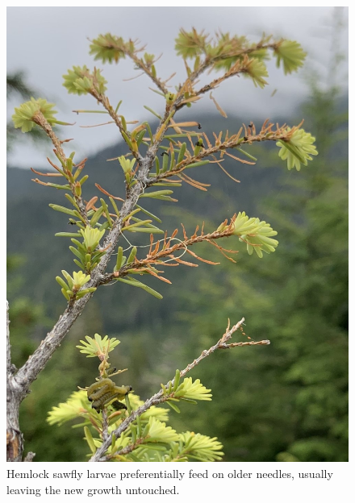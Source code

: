 \begin{multicols}{2} 



\begin{figure}[H]
\begin{center}
\vspace{2mm}
\includegraphics[width=\textwidth]{img/hemlock_sawfly_wasteful_feeder.jpg}
\caption{Hemlock sawfly larvae preferentially feed on older needles, usually leaving the new growth untouched.}
\label{hemlock_sawfly_wasteful_feeder}
\end{center}
\end{figure} 


\end{multicols}
